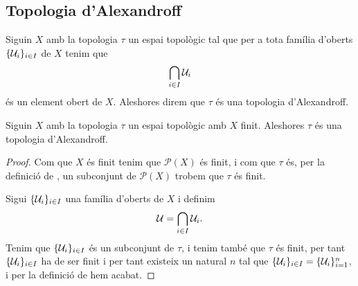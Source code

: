 \documentclass[../Apunts.tex]{subfiles}
\begin{document}
	\subsection{Topologia d'Alexandroff}
	\begin{definition}
		\label{def:topologia d'Alexandroff}
		Siguin \(X\) amb la topologia \(\tau\) un espai topològic tal que per a tota família d'oberts \(\{\mathcal{U}_{i}\}_{i\in I}\) de \(X\) tenim que
		\[\bigcap_{i\in I}\mathcal{U}_{i}\]
		és un element obert de \(X\). Aleshores direm que \(\tau\) és una topologia d'Alexandroff.
	\end{definition}
	\begin{proposition}
		\label{prop:els espais topològics finits són d'Alexandroff}
		Siguin \(X\) amb la topologia \(\tau\) un espai topològic amb \(X\) finit. Aleshores \(\tau\) és una topologia d'Alexandroff.
		\begin{proof}
			Com que \(X\) és finit tenim que \(\mathcal{P}(X)\) és finit, i com que \(\tau\) és, per la definició de , un subconjunt de \(\mathcal{P}(X)\) trobem que \(\tau\) és finit. %
			
			Sigui \(\{\mathcal{U}_{i}\}_{i\in I}\) una família d'oberts de \(X\) i definim
			\[\mathcal{U}=\bigcap_{i\in I}\mathcal{U}_{i}.\]
			Tenim que \(\{\mathcal{U}_{i}\}_{i\in I}\) és un subconjunt de \(\tau\), i tenim també que \(\tau\) és finit, per tant \(\{\mathcal{U}_{i}\}_{i\in I}\) ha de ser finit i per tant existeix un natural \(n\) tal que \(\{\mathcal{U}_{i}\}_{i\in I}=\{\mathcal{U}_{i}\}_{i=1}^{n}\), i per la definició de  hem acabat.
		\end{proof}
	\end{proposition}
\end{document}
